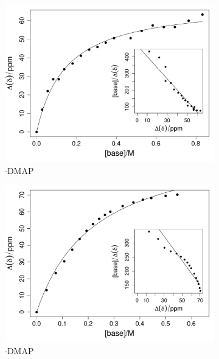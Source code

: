 \begin{refsection}
\begin{figure}
\begin{subfigure}{0.45\linewidth}
    \includegraphics[width=\linewidth]{Figures/nmr-titration/ph-ebs-dmap.pdf}
    \caption{$ \cdot $DMAP}
  \end{subfigure}
  \begin{subfigure}{0.45\linewidth}
    \includegraphics[width=\linewidth]{Figures/nmr-titration/4br-ebs-dmap.pdf}
    \caption{$ \cdot $DMAP}
  \end{subfigure}
  \begin{subfigure}{0.45\linewidth}

\end{subfigure}
\end{figure}
\end{refsection}
